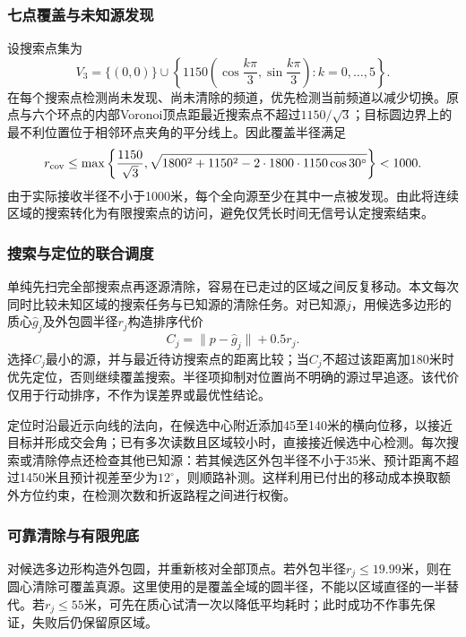 \documentclass{JXUSTmodeling}
\begin{document}
\subsubsection{七点覆盖与未知源发现}
设搜索点集为
\begin{equation}
 V_3=\{(0,0)\}\cup\left\{1150
 \left(\cos\frac{k\pi}{3},\sin\frac{k\pi}{3}\right):k=0,\ldots,5\right\}.
 \label{eq:p3-points}
\end{equation}
在每个搜索点检测尚未发现、尚未清除的频道，优先检测当前频道以减少切换。原点与六个环点的内部Voronoi顶点距最近搜索点不超过$1150/\sqrt3$；目标圆边界上的最不利位置位于相邻环点夹角的平分线上。因此覆盖半径满足
\begin{equation}
 r_{\rm cov}\le\max\left\{\frac{1150}{\sqrt3},
 \sqrt{1800^2+1150^2-2\cdot1800\cdot1150\cos30^\circ}\right\}<1000.
 \label{eq:p3-cover}
\end{equation}
由于实际接收半径不小于1000米，每个全向源至少在其中一点被发现。由此将连续区域的搜索转化为有限搜索点的访问，避免仅凭长时间无信号认定搜索结束。

\subsubsection{搜索与定位的联合调度}
单纯先扫完全部搜索点再逐源清除，容易在已走过的区域之间反复移动。本文每次同时比较未知区域的搜索任务与已知源的清除任务。对已知源$j$，用候选多边形的质心$\widehat g_j$及外包圆半径$r_j$构造排序代价
\begin{equation}
 C_j=\|p-\widehat g_j\|+0.5r_j.
 \label{eq:p3-cost}
\end{equation}
选择$C_j$最小的源，并与最近待访搜索点的距离比较；当$C_j$不超过该距离加180米时优先定位，否则继续覆盖搜索。半径项抑制对位置尚不明确的源过早追逐。该代价仅用于行动排序，不作为误差界或最优性结论。

定位时沿最近示向线的法向，在候选中心附近添加45至140米的横向位移，以接近目标并形成交会角；已有多次读数且区域较小时，直接接近候选中心检测。每次搜索或清除停点还检查其他已知源：若其候选区外包半径不小于35米、预计距离不超过1450米且预计视差至少为$12^\circ$，则顺路补测。这样利用已付出的移动成本换取额外方位约束，在检测次数和折返路程之间进行权衡。

\subsubsection{可靠清除与有限兜底}
对候选多边形构造外包圆，并重新核对全部顶点。若外包半径$r_j\le19.99$米，则在圆心清除可覆盖真源。这里使用的是覆盖全域的圆半径，不能以区域直径的一半替代。若$r_j\le55$米，可先在质心试清一次以降低平均耗时；此时成功不作事先保证，失败后仍保留原区域。
\end{document}
